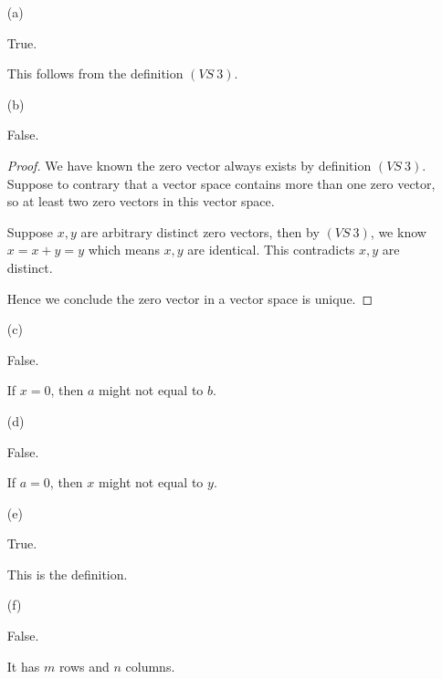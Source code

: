 \begin{Exercise}
\begin{enumerate}[(a)]
\item [(a)]
\begin{answer}
True.
\end{answer}
\begin{solution}
This follows from the definition $(VS\ 3)$.
\end{solution}

\item [(b)]
\begin{answer}
False.
\end{answer}
\begin{proof}
We have known the zero vector always exists by definition $(VS\ 3)$. Suppose to contrary that a vector space contains more than one zero vector, so at least two zero vectors in this vector space. 

Suppose $x,y$ are arbitrary distinct zero vectors, then by $(VS\ 3)$, we know $x = x+y =y$ which means $x,y$ are identical. This contradicts $x,y$ are distinct.

Hence we conclude the zero vector in a vector space is unique.
\end{proof}

\item [(c)]
\begin{answer}
False.
\end{answer}
\begin{solution}
If $x = 0$, then $a$ might not equal to $b$.
\end{solution}

\item [(d)]
\begin{answer}
False.
\end{answer}
\begin{solution}
If $a = 0$, then $x$ might not equal to $y$.
\end{solution}

\item [(e)]
\begin{answer}
True.
\end{answer}
\begin{solution}
This is the definition.
\end{solution}

\item [(f)]
\begin{answer}
False.
\end{answer}
\begin{solution}
It has $m$ rows and $n$ columns.
\end{solution}


\end{enumerate}
\end{Exercise}
